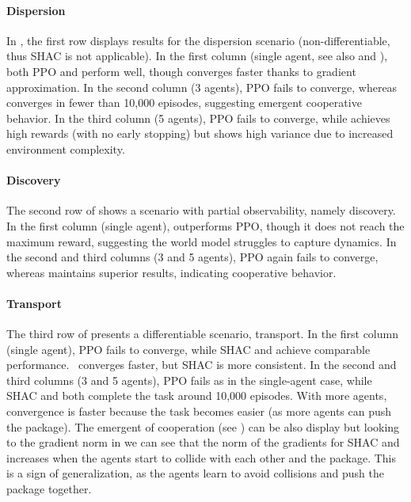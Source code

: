 \paragraph{Dispersion}
In , the first row displays results for the dispersion scenario (non-differentiable, thus SHAC is not applicable). In the first column (single agent, see also  and ), both PPO and \fname{} perform well, though \fname{} converges faster thanks to gradient approximation. In the second column (3 agents), PPO fails to converge, whereas \fname{} converges in fewer than 10,000 episodes, suggesting emergent cooperative behavior. In the third column (5 agents), PPO fails to converge, while \fname{} achieves high rewards (with no early stopping) but shows high variance due to increased environment complexity.

\paragraph{Discovery} 
The second row of  shows a scenario with partial observability, namely discovery. In the first column (single agent), \fname{} outperforms PPO, though it does not reach the maximum reward, suggesting the world model struggles to capture dynamics. In the second and third columns (3 and 5 agents), PPO again fails to converge, whereas \fname{} maintains superior results, indicating cooperative behavior.

\paragraph{Transport}
The third row of  presents a differentiable scenario, transport. In the first column (single agent), PPO fails to converge, while SHAC and \fname{} achieve comparable performance.\ \fname{} converges faster, but SHAC is more consistent. In the second and third columns (3 and 5 agents), PPO fails as in the single-agent case, while SHAC and \fname{} both complete the task around 10,000 episodes. With more agents, convergence is faster because the task becomes easier (as more agents can push the package). The emergent of cooperation (see ) can be also display but looking to the gradient norm in  we can see that the norm of the gradients for SHAC and \fname{} increases when the agents start to collide with each other and the package. This is a sign of generalization, as the agents learn to avoid collisions and push the package together.

